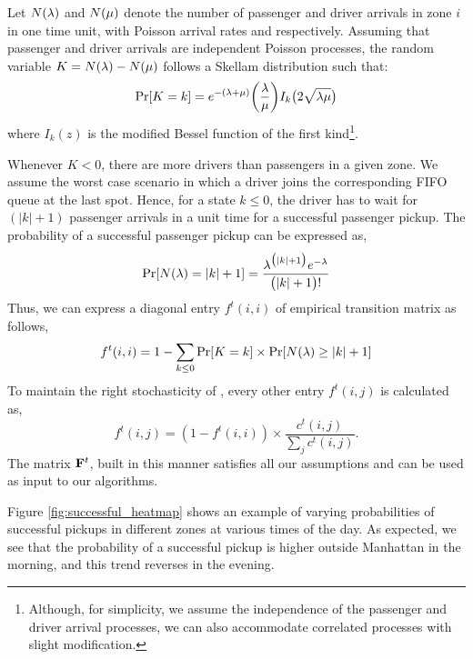 Let $N(\lambda)$ and $N(\mu)$ denote the number of passenger and driver arrivals in zone $i$ in one time unit, with Poisson arrival rates {\passengerarrivalrate} and {\driverarrivalrate} respectively. Assuming that passenger and driver arrivals are independent Poisson processes, the random variable $K = N(\lambda) - N(\mu)$ follows a Skellam distribution 
such that:
\begin{equation}
\Pr[K=k] = e^{-(\lambda + \mu)} \bigg(\frac{\lambda}{\mu}\bigg) I_k\big(2 \sqrt{\lambda \mu}\big)
\end{equation}
where $I_k(z)$ is the modified Bessel function of the first kind\footnote{Although, for simplicity, we assume the independence of the passenger and driver arrival processes, we can also accommodate correlated processes with slight modification.}.

Whenever %
$K<0$, there are more drivers than passengers in a given zone. We assume the worst case scenario in which a driver joins the corresponding FIFO queue at the last spot. Hence, for a state $k \leq 0$, the driver has to wait for $(|k| + 1)$ passenger arrivals in a unit time for a successful passenger pickup. The probability of a successful passenger pickup can be expressed as,
\begin{equation}
\Pr[N(\lambda) = |k| + 1] = \frac{\lambda^{\big(|k|+1\big)} e^{-\lambda}}{\big(|k| + 1\big)!}
\end{equation}
Thus, we can express a diagonal entry $f^t(i,i)$ of empirical transition matrix as follows,
\begin{equation}
f^t(i,i) = 1 - \sum_{k \leq 0} \Pr[K = k] \times \Pr[N(\lambda) \geq |k| + 1]
\end{equation}
To maintain the right stochasticity of {\empiricaltransitionmatrix}, every other entry 
$f^t(i,j)$ is calculated as,
\begin{equation}
f^t(i,j) = (1 - f^t(i,i)) \times \frac{c^t(i,j)}{\sum_{j}c^t(i,j)}. 
\end{equation}
The matrix ${\mathbf{F}}^t$, built in this manner satisfies all our assumptions and can be used as input to our algorithms. 

Figure \ref{fig:successful_heatmap} shows an example of varying probabilities of successful pickups in different zones at various times of the day. As expected, we see that the probability of a successful pickup is higher outside Manhattan in the morning, and this trend reverses in the evening.

